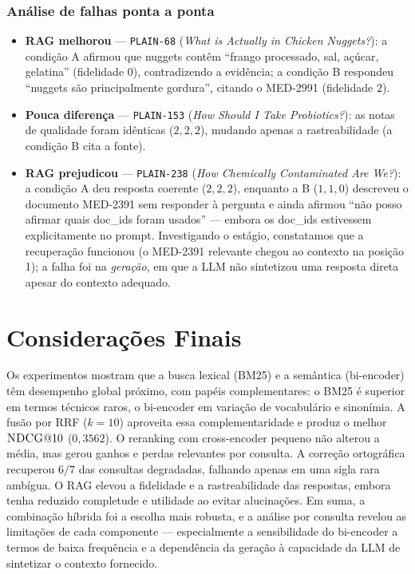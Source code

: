 \documentclass[9pt,a4paper,twocolumn]{article}
\newcommand{\bmk}{\textsc{BM25}}
\newcommand{\rrf}{\textsc{RRF}}
\newcommand{\ndcg}{\textsc{NDCG}}
\begin{document}
\subsubsection{Análise de falhas ponta a ponta}
\begin{itemize}
  \item \textbf{RAG melhorou} --- \texttt{PLAIN-68} (\emph{What is Actually in Chicken Nuggets?}):
  a condição A afirmou que nuggets contêm ``frango processado, sal, açúcar, gelatina''
  (fidelidade $0$), contradizendo a evidência; a condição B respondeu ``nuggets são principalmente
  gordura'', citando o MED-2991 (fidelidade $2$).
  \item \textbf{Pouca diferença} --- \texttt{PLAIN-153} (\emph{How Should I Take Probiotics?}):
  as notas de qualidade foram idênticas ($2,2,2$), mudando apenas a rastreabilidade (a condição B
  cita a fonte).
  \item \textbf{RAG prejudicou} --- \texttt{PLAIN-238} (\emph{How Chemically Contaminated Are
  We?}): a condição A deu resposta coerente ($2,2,2$), enquanto a B ($1,1,0$) descreveu o documento
  MED-2391 sem responder à pergunta e ainda afirmou ``não posso afirmar quais doc\_ids foram
  usados'' --- embora os doc\_ids estivessem explicitamente no prompt. Investigando o estágio,
  constatamos que a recuperação funcionou (o MED-2391 relevante chegou ao contexto na posição 1);
  a falha foi na \emph{geração}, em que a LLM não sintetizou uma resposta direta apesar do contexto
  adequado.
\end{itemize}

\section{Considerações Finais}
Os experimentos mostram que a busca lexical (\bmk{}) e a semântica (bi-encoder) têm desempenho
global próximo, com papéis complementares: o \bmk{} é superior em termos técnicos raros, o
bi-encoder em variação de vocabulário e sinonímia. A fusão por \rrf{} ($k=10$) aproveita essa
complementaridade e produz o melhor $\ndcg{}@10$ ($0{,}3562$). O reranking com cross-encoder
pequeno não alterou a média, mas gerou ganhos e perdas relevantes por consulta. A correção
ortográfica recuperou $6/7$ das consultas degradadas, falhando apenas em uma sigla rara ambígua.
O RAG elevou a fidelidade e a rastreabilidade das respostas, embora tenha reduzido completude e
utilidade ao evitar alucinações. Em suma, a combinação híbrida foi a escolha mais robusta, e a
análise por consulta revelou as limitações de cada componente --- especialmente a sensibilidade do
bi-encoder a termos de baixa frequência e a dependência da geração à capacidade da LLM de
sintetizar o contexto fornecido.
\end{document}
